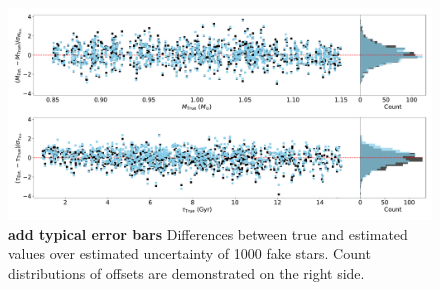 \begin{figure}
	\includegraphics[width=1.8\columnwidth]{fake-stars-test-2.pdf}
    \caption{{\bf add typical error bars} Differences between true and estimated values over estimated uncertainty of 1000 fake stars. Count distributions of offsets are demonstrated on the right side.} 
  \label{fig:fake_test}
\end{figure}









